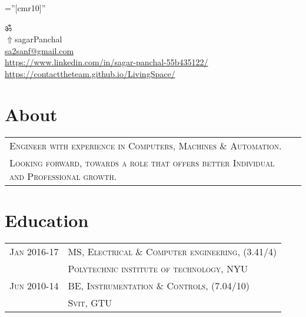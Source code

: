 \documentclass[a4paper]{article}
\begin{document}
\pagestyle{empty} 						%
\font\fb=''[cmr10]'' 						%

\par	{\centering
	ॐ																																\\
	\href{https://contacttheteam.github.io/LivingSpace/}{$ \Uparrow$}{sagarPanchal}																																\\
	\small \href{mailto:sa2sanf@gmail.com}{sa2sanf@gmail.com}																						\\
	\small \href{https://www.linkedin.com/in/sagar-panchal-55b435122/}{https://www.linkedin.com/in/sagar-panchal-55b435122/}		\textbullet \href{https://contacttheteam.github.io/LivingSpace/}{https://contacttheteam.github.io/LivingSpace/}		\par}
	
\section	{	About		}
	\begin{tabular}{ll}
		\textsc{	Engineer with experience in Computers,  Machines \& Automation.					}\\
		\textsc{	Looking forward,  towards a role that offers better Individual and Professional growth.	}
	\\\end{tabular}



\section	{	Education		}
	\begin{tabular}{rl}
		\small{}\textsc{		Jan 2016-17	} 		& 		\textsc{	MS, Electrical \& Computer engineering, 		\small {(3.41/4)}			}	\\
 											& 		\textsc{	Polytechnic institute of technology, NYU							}	\\
 		\small{}\textsc{		Jun 2010-14	} 		& 		\textsc{	BE, Instrumentation \small{\&} Controls,		\small {(7.04/10)}		}	\\
 											& 		\textsc{	Svit, GTU													}	\\
	\end{tabular}
\end{document}
